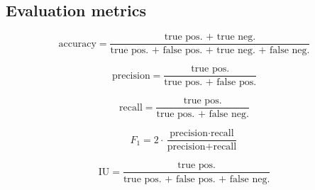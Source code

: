 \subsection{Evaluation metrics}

$$ \text{accuracy} = \frac{\text{true pos. + true neg.}}{\text{true pos. + false pos. + true neg. + false neg.}}$$

$$\text{precision} = \frac{\text{true pos.}}{\text{true pos. + false pos.}}$$

$$\text{recall} = \frac{\text{true pos.}}{\text{true pos. + false neg.}}$$

$$F_1 = 2 \cdot \frac{\text{precision} \cdot \text{recall}}{\text{precision}+\text{recall}}$$

$$ \text{IU} = \frac{\text{true pos.}}{\text{true pos. + false pos. + false neg.}}$$




%

